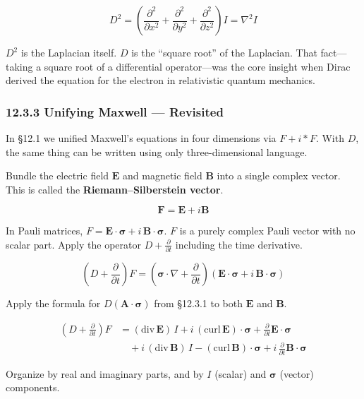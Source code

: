 \documentclass[a4paper,12pt,openany]{book}
\begin{document}
\[D^2 = \left(\frac{\partial^2}{\partial x^2} + \frac{\partial^2}{\partial y^2} + \frac{\partial^2}{\partial z^2}\right)I = \nabla^2 I\]

\(D^2\) is the Laplacian itself. \(D\) is the ``square root'' of the
Laplacian. That fact—taking a square root of a differential
operator—was the core insight when Dirac derived the equation for the
electron in relativistic quantum mechanics.

\hypertarget{unifying-maxwell-revisited}{%
\subsubsection{12.3.3 Unifying Maxwell —
Revisited}\label{unifying-maxwell-revisited}}

In §12.1 we unified Maxwell's equations in four dimensions via
\(F + i\ast F\). With \(D\), the same thing can be written using only
three-dimensional language.

Bundle the electric field \(\mathbf{E}\) and magnetic field
\(\mathbf{B}\) into a single complex vector. This is called the
\textbf{Riemann–Silberstein vector}.

\[\mathbf{F} = \mathbf{E} + i\mathbf{B}\]

In Pauli matrices,
\(F = \mathbf{E}\!\cdot\!\bm{\sigma} + i\,\mathbf{B}\!\cdot\!\bm{\sigma}\).
\(F\) is a purely complex Pauli vector with no scalar part. Apply the
operator \(D + \frac{\partial}{\partial t}\) including the time
derivative.

\[(D + \frac{\partial}{\partial t})F = (\bm{\sigma}\!\cdot\!\nabla + \frac{\partial}{\partial t})(\mathbf{E}\!\cdot\!\bm{\sigma} + i\,\mathbf{B}\!\cdot\!\bm{\sigma})\]

Apply the formula for \(D(\mathbf{A}\!\cdot\!\bm{\sigma})\) from §12.3.1
to both \(\mathbf{E}\) and \(\mathbf{B}\).

\[
\begin{aligned}
(D + \frac{\partial}{\partial t})F &= (\mathrm{div}\,\mathbf{E})\,I + i\,(\mathrm{curl}\,\mathbf{E})\!\cdot\!\bm{\sigma} + \frac{\partial}{\partial t}\mathbf{E}\!\cdot\!\bm{\sigma} \\
&\quad + i\,(\mathrm{div}\,\mathbf{B})\,I - (\mathrm{curl}\,\mathbf{B})\!\cdot\!\bm{\sigma} + i\,\frac{\partial}{\partial t}\mathbf{B}\!\cdot\!\bm{\sigma}
\end{aligned}
\]

Organize by real and imaginary parts, and by \(I\) (scalar) and
\(\bm{\sigma}\) (vector) components.
\end{document}

